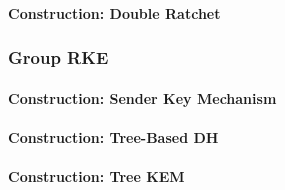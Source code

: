 \documentclass[a4paper,orivec]{llncs}
\begin{document}
\paragraph{Construction: Double Ratchet}

\subsubsection{Group RKE}

\paragraph{Construction: Sender Key Mechanism}

\paragraph{Construction: Tree-Based DH}

\paragraph{Construction: Tree KEM}


\end{document}
